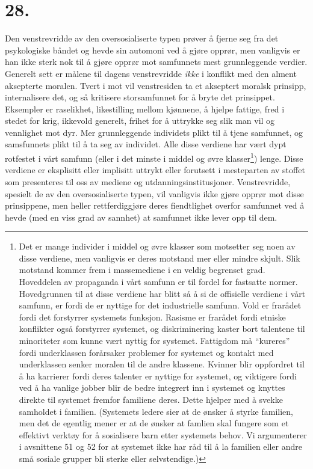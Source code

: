 \documentclass[oneside]{book}
\begin{document}
\section*{28.}
Den venstrevridde av den oversosialiserte typen prøver å fjerne seg fra det
psykologiske båndet og hevde sin automoni ved å gjøre opprør, men vanligvis er
han ikke sterk nok til å gjøre opprør mot samfunnets mest grunnleggende
verdier. Generelt sett er målene til dagens venstrevridde {\em ikke} i konflikt
med den alment aksepterte moralen. Tvert i mot vil venstresiden ta et akseptert
moralsk prinsipp, internalisere det, og så kritisere storsamfunnet for å bryte
det prinsippet. Eksempler er raselikhet, likestilling mellom kjønnene, å hjelpe
fattige, fred i stedet for krig, ikkevold generelt, frihet for å uttrykke seg
slik man vil og vennlighet mot dyr. Mer grunnleggende individets plikt til å
tjene samfunnet, og samsfunnets plikt til å ta seg av individet. Alle disse
verdiene har vært dypt rotfestet i vårt samfunn (eller i det minste i middel og
øvre klasser\footnote{Det er mange individer i middel og øvre klasser som
motsetter seg noen av disse verdiene, men vanligvis er deres motstand mer eller
mindre skjult. Slik motstand kommer frem i massemediene i en veldig begrenset
grad. Hoveddelen av propaganda i vårt samfunn er til fordel for fastsatte
normer. Hovedgrunnen til at disse verdiene har blitt så å si de offisielle
verdiene i vårt samfunn, er fordi de er nyttige for det industrielle samfunn.
Vold er frarådet fordi det forstyrrer systemets funksjon. Rasisme er frarådet
fordi etniske konflikter også forstyrrer systemet, og diskriminering kaster
bort talentene til minoriteter som kunne vært nyttig for systemet. Fattigdom må
``kureres'' fordi underklassen forårsaker problemer for systemet og kontakt med
underklassen senker moralen til de andre klassene. Kvinner blir oppfordret til
å ha karrierer fordi deres talenter er nyttige for systemet, og viktigere fordi
ved å ha vanlige jobber blir de bedre integrert inn i systemet og knyttes
direkte til systemet fremfor familiene deres. Dette hjelper med å svekke
samholdet i familien. (Systemets ledere sier at de ønsker å styrke familien,
men det de egentlig mener er at de ønsker at famlien skal fungere som et
effektivt verktøy for å sosialisere barn etter systemets behov. Vi argumenterer
i avsnittene 51 og 52 for at systemet ikke har råd til å la familien eller
andre små sosiale grupper bli sterke eller selvstendige.)}) lenge. Disse
verdiene er eksplisitt eller implisitt uttrykt eller forutsett i mesteparten av
stoffet som presenteres til oss av mediene og utdanningsinstitusjoner.
Venstrevridde, spesielt de av den oversosialiserte typen, vil vanligvis ikke
gjøre opprør mot disse prinsippene, men heller rettferdiggjøre deres
fiendtlighet overfor samfunnet ved å hevde (med en viss grad av sannhet) at
samfunnet ikke lever opp til dem.
\end{document}
